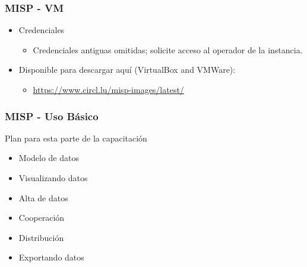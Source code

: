 


\begin{frame}[t,plain]
\titlepage
\end{frame}

\begin{frame}
    \frametitle{MISP - VM}
    \begin{itemize}
    \item Credenciales
        \begin{itemize}
            \item Credenciales antiguas omitidas; solicite acceso al operador de la instancia.
        \end{itemize}
    \item Disponible para descargar aquí (VirtualBox and VMWare):
        \begin{itemize}
                \item \url{https://www.circl.lu/misp-images/latest/}
        \end{itemize}
    \end{itemize}
\end{frame}

\begin{frame}
    \frametitle{MISP - Uso Básico}
    Plan para esta parte de la capacitación
        \begin{itemize}
            \item Modelo de datos
            \item Visualizando datos
            \item Alta de datos
            \item Cooperación
            \item Distribución
            \item Exportando datos
        \end{itemize}
\end{frame}

